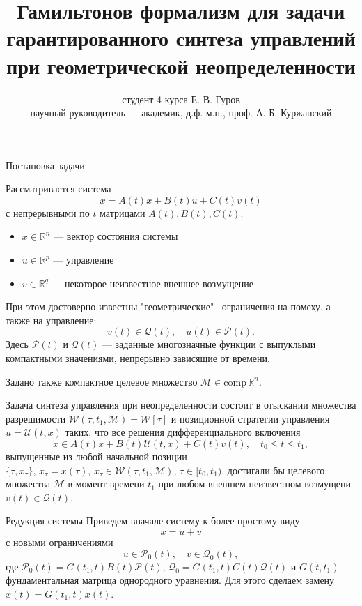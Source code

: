 \documentclass{beamer}
\title[ВКР]
{Гамильтонов формализм для задачи гарантированного синтеза управлений при геометрической неопределенности}
\author[Е. В. Гуров]
{студент 4 курса Е. В. Гуров \\
научный руководитель --- академик, д.ф.-м.н., проф. А. Б. Куржанский}
\institute[СА]
{ Кафедра системного анализа \\
факультета ВМК МГУ имени М.В. Ломоносова}
\date[28 апреля 2022 г.]
\begin{document}
\frame{\titlepage}

\begin{frame}{Постановка задачи}

Рассматривается система
\begin{equation*}
    \dot{x} = A(t)x + B(t)u + C(t)v(t)
\end{equation*}
с непрерывными по \( t \) матрицами \( A(t), B(t), C(t) \).
\begin{itemize}
    \item \( x \in \mathbb{R}^n \) --- вектор состояния системы
    \item \( u \in \mathbb{R}^p \) --- управление
    \item \( v \in \mathbb{R}^q \) --- некоторое неизвестное внешнее возмущение
\end{itemize}
При этом достоверно известны "геометрические" \ ограничения на помеху, а также на управление:
\begin{equation*}
    v(t) \in \mathcal{Q}(t), \quad u(t) \in \mathcal{P}(t).
\end{equation*}
 Здесь \( \mathcal{P}(t) \) и \( \mathcal{Q}(t) \) --- заданные многозначные
 функции с выпуклыми компактными значениями, непрерывно зависящие от времени.
 
 Задано также компактное целевое множество \( \mathcal{M} \in \text{comp} \, \mathbb{R}^n \).

\end{frame}

\begin{frame}

Задача синтеза управления при неопределенности состоит в отыскании множества разрешимости \( \mathcal{W}(\tau, t_1, \mathcal{M}) = \mathcal{W}[\tau] \) и позиционной стратегии управления \( u = \mathcal{U}(t,x) \) таких, что все решения дифференциального включения
 \begin{equation*}\label{dif_inclusion}
    \dot{x} \in A(t)x + B(t)\mathcal{U}(t,x) + C(t)v(t), \quad t_0 \le t \le t_1, 
\end{equation*}
выпущенные из любой начальной позиции \( \{\tau, x_{\tau}\}, \, x_{\tau} = x(\tau), \, x_{\tau} \in \mathcal{W}(\tau, t_1, \mathcal{M}), \, \tau \in [t_0, t_1) \), достигали бы целевого множества \( \mathcal{M} \) в момент времени \( t_1 \) при любом внешнем неизвестном возмущени \( v(t) \in \mathcal{Q}(t) \). 

\end{frame}

\begin{frame}{Редукция системы}
Приведем вначале систему к более простому виду
\begin{equation*}
    \dot{x} = u + v
\end{equation*}
с новыми ограничениями
\begin{equation*}
    u \in \mathcal{P}_0(t), \quad v \in \mathcal{Q}_0(t),
\end{equation*}
где \( \mathcal{P}_0(t) = G(t_1, t) B(t) \mathcal{P}(t), \, \mathcal{Q}_0 = G(t_1,t)C(t)\mathcal{Q}(t) \) и \( G(t,t_1) \) --- фундаментальная матрица однородного уравнения. Для этого сделаем замену \( x(t) = G(t_1, t)x(t) \).
\end{frame}
\end{document}
